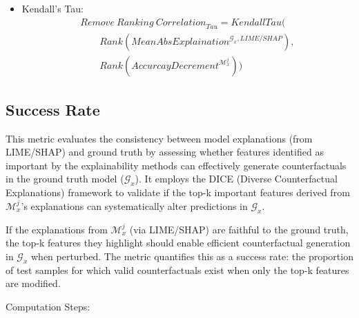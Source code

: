 \documentclass{article}
\begin{document}
\begin{enumerate}
\begin{itemize}
    \begin{align}
        &{Remove\ Ranking\ Correlation}_{Spearman} = 
        SpearmanCorrelation(\nonumber &\\ 
        &\qquad Rank\left(
        {MeanAbsExplaination}^{\mathcal{G}_{x},LIME/SHAP}
        \right),\nonumber &\\
        &\qquad  Rank\left({AccurcayDecrement}^{\mathcal{M}_{x}^{j}} \right)) \nonumber&
    \end{align}
        
        
    \item Kendall's Tau:
    \begin{align}
        &{Remove\ Ranking\ Correlation}_{Tau} = KendallTau( \nonumber & \\ &\qquad Rank\left({MeanAbsExplaination}^{\mathcal{G}_{x},LIME/SHAP} \right), & \nonumber \\
        &\qquad Rank\left( {AccurcayDecrement}^{\mathcal{M}_{x}^{j}} \right)) & \nonumber
    \end{align}
        
    \end{itemize}
\end{enumerate}

\subsection{Success Rate}

This metric evaluates the consistency between model explanations (from LIME/SHAP) and ground truth by assessing whether features identified as important by the explainability methods can effectively generate counterfactuals in the ground truth model ($\mathcal{G}_{x}$). It employs the DICE (Diverse Counterfactual Explanations) framework to validate if the top-k important features derived from $\mathcal{M}_{x}^{j}$'s explanations can systematically alter predictions in $\mathcal{G}_{x}$.

If the explanations from $\mathcal{M}_{x}^{j}$ (via LIME/SHAP) are faithful to the ground truth, the top-k features they highlight should enable efficient counterfactual generation in $\mathcal{G}_{x}$ when perturbed. The metric quantifies this as a success rate: the proportion of test samples for which valid counterfactuals exist when only the top-k features are modified.

Computation Steps:
\end{document}
